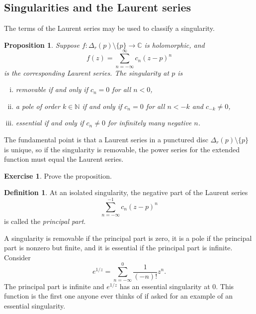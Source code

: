 \documentclass[12pt,openany]{book}
\newcommand{\C}{{\mathbb{C}}}
\newcommand{\N}{{\mathbb{N}}}
\newcommand{\myindex}[1]{#1\index{#1}}
\theoremstyle{plain}
\newtheorem{prop}[thm]{Proposition}
\theoremstyle{remark}
\theoremstyle{definition}
\newtheorem{defn}[thm]{Definition}
\newenvironment{exbox}{%
    \def\FrameCommand{\vrule width 1pt \relax\hspace{10pt}}%
    \MakeFramed{\advance\hsize-\width\FrameRestore}%
}{%
    \endMakeFramed
}
\theoremstyle{exercise}
\newtheorem{exercise}{Exercise}[section]
\theoremstyle{example}
\begin{document}
\subsection{Singularities and the Laurent series}

The terms of the Laurent series may be used to 
classify a singularity.

\begin{prop}
Suppose $f \colon \Delta_r(p) \setminus \{p\} \to \C$ is holomorphic,
and
\begin{equation*}
f(z) = \sum_{n=-\infty}^\infty c_n {(z-p)}^n
\end{equation*}
is the corresponding Laurent series.
The singularity at $p$ is
\begin{enumerate}[(i)]
\item \emph{removable} if and only if $c_n = 0$ for all $n < 0$,
\item a \emph{pole} of order $k \in \N$ if and only if $c_n = 0$ for all $n < -k$ and
$c_{-k} \neq 0$,
\item \emph{essential} if and only if $c_n \neq 0$ for infinitely many negative $n$.
\end{enumerate}
\end{prop}

The fundamental point is that a Laurent series in a punctured
disc $\Delta_r(p) \setminus \{p\}$ is unique,
so if the singularity is removable, the power
series for the extended function must equal the Laurent series.

\begin{exbox}
\begin{exercise}
Prove the proposition.
\end{exercise}
\end{exbox}

\begin{defn} \label{defn:principalpart}
At an isolated singularity, the negative part of the Laurent series
\begin{equation*}
\sum_{n=-\infty}^{-1} c_n {(z-p)}^n 
\end{equation*}
is called the \emph{\myindex{principal part}}.
\end{defn}

A singularity is
removable if the principal part is zero, it is a pole if the principal part
is nonzero but finite, and it is essential if the principal part is infinite.
Consider
\begin{equation*}
e^{1/z}
=
\sum_{n=-\infty}^0 \frac{1}{(-n)!} z^n .
\end{equation*}
The principal part is infinite and $e^{1/z}$ has an essential
singularity at $0$.  This function is the first one anyone ever thinks of
if asked for an example of an essential singularity.
\end{document}
